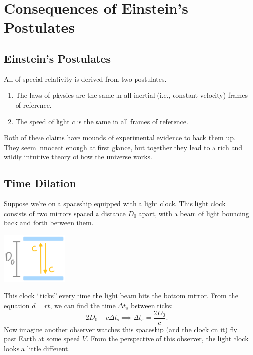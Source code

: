 \documentclass[10pt,a4paper,oneside]{book}
\begin{document}
\tableofcontents

\chapter{Consequences of Einstein's Postulates}
\section{Einstein's Postulates}
All of special relativity is derived from two postulates.
\begin{enumerate}
    \item The laws of physics are the same in all inertial (i.e., constant-velocity) frames of reference.
    \item The speed of light $c$ is the same in all frames of reference.
\end{enumerate}
Both of these claims have mounds of experimental evidence to back them up.
They seem innocent enough at first glance, but together they lead to a rich and wildly intuitive theory of how the universe works.

\section{Time Dilation}
Suppose we're on a spaceship equipped with a light clock.
This light clock consists of two mirrors spaced a distance $D_0$ apart, with a beam of light bouncing back and forth between them.
\begin{center}
    \includegraphics[width=0.25\textwidth]{statLightClock.png}
\end{center}
This clock ``ticks'' every time the light beam hits the bottom mirror.
From the equation $d = rt$, we can find the time $\Delta t_s$ between ticks:
\[ 2D_0 - c \Delta t_s \implies \Delta t_s = \frac{2D_0}{c}. \]
Now imagine another observer watches this spaceship (and the clock on it) fly past Earth at some speed $V$.
From the perspective of this observer, the light clock looks a little different.
\end{document}
